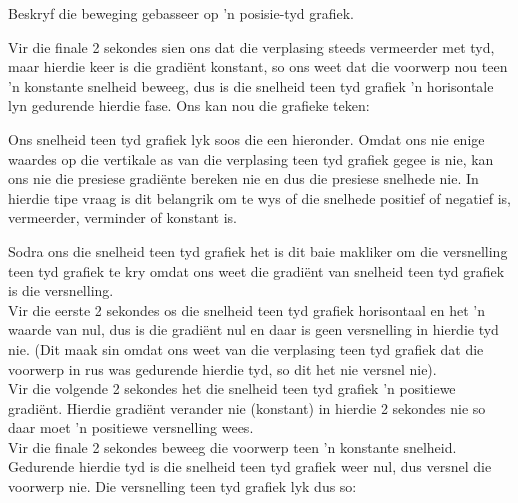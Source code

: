 \begin{wex}{Beskryf die beweging gebasseer op 'n posisie-tyd grafiek.}
{
Vir die finale 2 sekondes sien ons dat die verplasing steeds vermeerder met tyd, maar hierdie keer is die gradi\"ent konstant, so ons weet dat die voorwerp nou teen 'n konstante snelheid beweeg, dus is die snelheid teen tyd grafiek 'n horisontale lyn gedurende hierdie fase. Ons kan nou die grafieke teken:

Ons snelheid teen tyd grafiek lyk soos die een hieronder. Omdat ons nie enige waardes op die vertikale as van die verplasing teen tyd grafiek gegee is nie, kan ons nie die presiese gradi\"ente bereken nie en dus die presiese snelhede nie. In hierdie tipe vraag is dit belangrik om te wys of die snelhede positief of negatief is, vermeerder, verminder of konstant is.

\begin{center}
\end{center}

Sodra ons die snelheid teen tyd grafiek het is dit baie makliker om die versnelling teen tyd grafiek te kry omdat ons weet die gradi\"ent van snelheid teen tyd grafiek is die versnelling.\\

Vir die eerste 2 sekondes os die snelheid teen tyd grafiek horisontaal en het 'n waarde van nul, dus is die gradi\"ent nul en daar is geen versnelling in hierdie tyd nie. (Dit maak sin omdat ons weet van die verplasing teen tyd grafiek dat die voorwerp in rus was gedurende hierdie tyd, so dit het nie versnel nie).\\ 

Vir die volgende 2 sekondes het die snelheid teen tyd grafiek 'n positiewe gradi\"ent. Hierdie gradi\"ent verander nie (konstant) in hierdie 2 sekondes nie so daar moet 'n positiewe versnelling wees. \\

Vir die finale 2 sekondes beweeg die voorwerp teen 'n konstante snelheid. Gedurende hierdie tyd is die snelheid teen tyd grafiek weer nul, dus versnel die voorwerp nie. Die versnelling teen tyd grafiek lyk dus so:

}
\end{wex}
